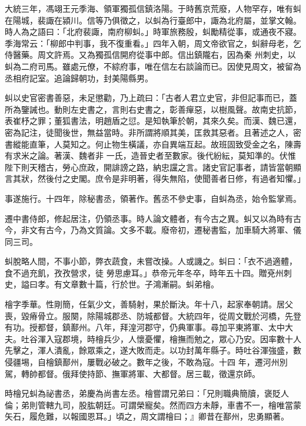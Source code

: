 \begin{pinyinscope}
 大統三年，馮翊王元季海、領軍獨孤信鎮洛陽。于時舊京荒廢，人物罕存，唯有虯在陽城，裴諏在潁川。信等乃俱徵之，以虯為行臺郎中，諏為北府屬，並掌文翰。時人為之語曰：「北府裴諏，南府柳虯。」時軍旅務殷，虯勵精從事，或通夜不寢。季海常云：「柳郎中判事，我不復重看。」四年入朝，周文帝欲官之，虯辭母老，乞侍醫藥。周文許焉。又為獨孤信開府從事中郎。信出鎮隴右，因為秦
 州刺史，以虯為二府司馬。雖處元僚，不綜府事，唯在信左右談論而已。因使見周文，被留為丞相府記室。追論歸朝功，封美陽縣男。



 虯以史官密書善惡，未足懲勸，乃上疏曰：「古者人君立史官，非但記事而已，蓋所為鑒誡也。動則左史書之，言則右史書之，彰善癉惡，以樹風聲。故南史抗節，表崔杼之罪；董狐書法，明趙盾之愆。是知執筆於朝，其來久矣。而漢、魏已還，密為記注，徒聞後世，無益當時。非所謂將順其美，匡救其惡者。且著述之人，密書縱能直筆，人莫知之。何止物生橫議，亦自異端互起。故班固致受金之名，陳壽有求米之論。著漢、魏者非
 一氏，造晉史者至數家。後代紛紜，莫知準的。伏惟陛下則天稽古，勞心庶政，開誹謗之路，納忠讜之言。諸史官記事者，請皆當朝顯言其狀，然後付之史閣。庶令是非明著，得失無陷，使聞善者日修，有過者知懼。」



 事遂施行。十四年，除秘書丞，領著作。舊丞不參史事，自虯為丞，始令監掌焉。



 遷中書侍郎，修起居注，仍領丞事。時人論文體者，有今古之異。虯又以為時有古今，非文有古今，乃為文質論。文多不載。廢帝初，遷秘書監，加車騎大將軍、儀同三司。



 虯脫略人間，不事小節，弊衣蔬食，未嘗改操。人或譏之。虯曰：「衣不過適體，食不過充飢，孜孜營求，徒
 勞思慮耳。」恭帝元年冬卒，時年五十四。贈兗州刺史，謚曰孝。有文章數十篇，行於世。子鴻漸嗣。虯弟檜。



 檜字季華。性剛簡，任氣少文，善騎射，果於斷決。年十八，起家奉朝請。居父喪，毀瘠骨立。服闋，除陽城郡丞、防城都督。大統四年，從周文戰於河橋，先登有功。授都督，鎮鄯州。八年，拜湟河郡守，仍典軍事。尋加平東將軍、太中大夫。吐谷渾入寇郡境，時檜兵少，人懷憂懼，檜撫而勉之，眾心乃安。因率數十人先擊之，渾人潰亂，餘眾乘之，遂大敗而走。以功封萬年縣子。時吐谷渾強盛，數侵疆埸，自檜鎮鄯州，屢戰必破之。數年之後，不敢為寇。十四
 年，遷河州別駕，轉帥都督。俄拜使持節、撫軍將軍、大都督。居三載，徵還京師。



 時檜兄虯為祕書丞，弟慶為尚書左丞。檜嘗謂兄弟曰：「兄則職典簡牘，褒貶人倫；弟則管轄九司，股肱朝廷。可謂榮寵矣。然而四方未靜，車書不一，檜唯當蒙矢石，履危難，以報國恩耳。」頃之，周文謂檜曰；』卿昔在鄯州，忠勇顯著。




\end{pinyinscope}
